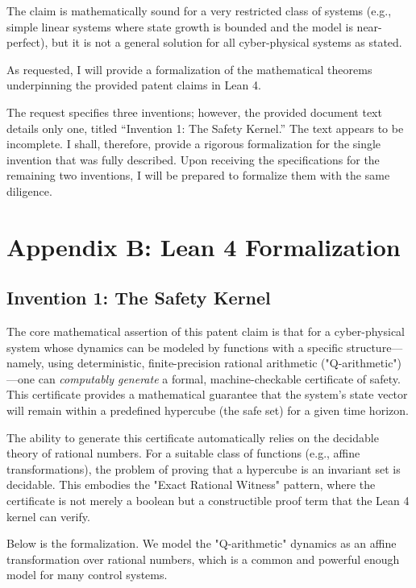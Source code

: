 \documentclass{article}
\begin{document}
The claim is mathematically sound for a very restricted class of systems (e.g., simple linear systems where state growth is bounded and the model is near-perfect), but it is not a general solution for all cyber-physical systems as stated.


As requested, I will provide a formalization of the mathematical theorems underpinning the provided patent claims in Lean 4.

The request specifies three inventions; however, the provided document text details only one, titled ``Invention 1: The Safety Kernel.'' The text appears to be incomplete. I shall, therefore, provide a rigorous formalization for the single invention that was fully described. Upon receiving the specifications for the remaining two inventions, I will be prepared to formalize them with the same diligence.

\section*{Appendix B: Lean 4 Formalization}

\subsection*{Invention 1: The Safety Kernel}

The core mathematical assertion of this patent claim is that for a cyber-physical system whose dynamics can be modeled by functions with a specific structure—namely, using deterministic, finite-precision rational arithmetic ("Q-arithmetic")—one can \textit{computably generate} a formal, machine-checkable certificate of safety. This certificate provides a mathematical guarantee that the system's state vector will remain within a predefined hypercube (the safe set) for a given time horizon.

The ability to generate this certificate automatically relies on the decidable theory of rational numbers. For a suitable class of functions (e.g., affine transformations), the problem of proving that a hypercube is an invariant set is decidable. This embodies the "Exact Rational Witness" pattern, where the certificate is not merely a boolean but a constructible proof term that the Lean 4 kernel can verify.

Below is the formalization. We model the "Q-arithmetic" dynamics as an affine transformation over rational numbers, which is a common and powerful enough model for many control systems.
\end{document}
